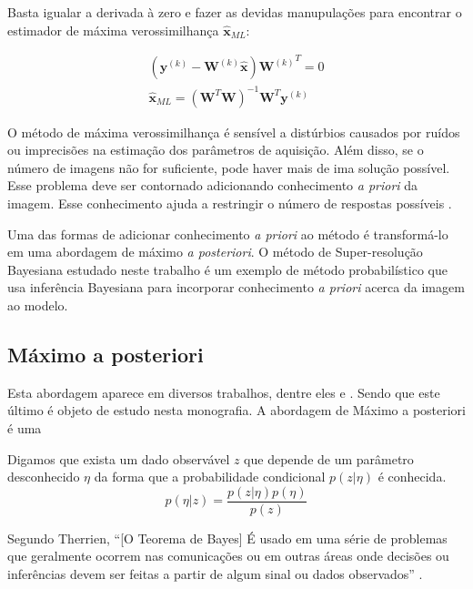Basta igualar a derivada à zero e fazer as devidas manupulações para encontrar o estimador de máxima verossimilhança $\hat{\mathbf{x}}_{ML}$: 

\begin{gather}
	(\mathbf{y}^{(k)} - \mathbf{W}^{(k)}\hat{\mathbf{x}}) {\mathbf{W}^{(k)}}^T = 0 \\
	\hat{\mathbf{x}}_{ML} = (\mathbf{W}^T\mathbf{W})^{-1} \mathbf{W}^T \mathbf{y}^{(k)}
\end{gather}

O método de máxima verossimilhança é sensível a distúrbios causados por ruídos ou
imprecisões na estimação dos parâmetros de aquisição.
Além disso, se o número de imagens não for suficiente, pode haver mais de ima solução
possível. Esse problema deve ser contornado adicionando conhecimento \emph{a priori} da
imagem.
Esse conhecimento ajuda a restringir o número de respostas possíveis \cite{nasrollahi2014super}.

Uma das formas de adicionar conhecimento \emph{a priori} ao método é transformá-lo em
uma abordagem de máximo \emph{a posteriori}.
O método de Super-resolução Bayesiana estudado neste trabalho é um exemplo de método probabilístico que usa inferência Bayesiana para incorporar conhecimento \emph{a priori} acerca da imagem ao modelo.

\subsection{Máximo a posteriori}
Esta abordagem aparece em diversos trabalhos, dentre eles \cite{pickup2007bayesian2,pickup2007bayesian} e \cite{tipping2003bayesian}.
Sendo que este último é objeto de estudo nesta monografia.
A abordagem de Máximo a posteriori é uma 

Digamos que exista um dado observável $z$ que depende de um parâmetro desconhecido $\eta$ da forma que a probabilidade condicional $p(z|\eta)$ é conhecida.
\begin{equation}
	p(\eta|z) = \frac{p(z|\eta) p(\eta)}{p(z)}
\end{equation}


Segundo Therrien, ``[O Teorema de Bayes] É usado em uma série de problemas que geralmente ocorrem nas comunicações ou em outras áreas onde decisões ou inferências devem ser feitas a partir de algum sinal ou dados observados'' \cite{therrien2011probability}.

